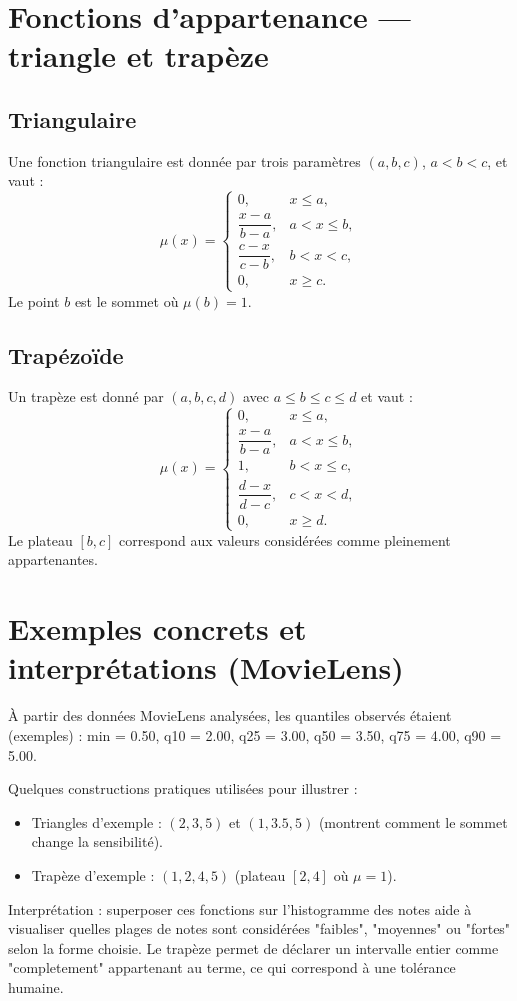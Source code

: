 \documentclass[a4paper,11pt]{article}
\begin{document}
\section{Fonctions d'appartenance — triangle et trapèze}
\subsection*{Triangulaire}
Une fonction triangulaire est donnée par trois paramètres $(a,b,c)$, $a<b<c$, et vaut :
$$
\mu(x)=\begin{cases}
0, & x\le a,\\
\dfrac{x-a}{b-a}, & a<x\le b,\\
\dfrac{c-x}{c-b}, & b<x<c,\\
0, & x\ge c.
\end{cases}
$$
Le point $b$ est le sommet où $\mu(b)=1$.

\subsection*{Trapézoïde}
Un trapèze est donné par $(a,b,c,d)$ avec $a\le b\le c\le d$ et vaut :
$$
\mu(x)=\begin{cases}
0, & x\le a,\\
\dfrac{x-a}{b-a}, & a<x\le b,\\
1, & b<x\le c,\\
\dfrac{d-x}{d-c}, & c<x<d,\\
0, & x\ge d.
\end{cases}
$$
Le plateau $[b,c]$ correspond aux valeurs considérées comme pleinement appartenantes.

\section{Exemples concrets et interprétations (MovieLens)}
À partir des données MovieLens analysées, les quantiles observés étaient (exemples) : min = 0.50, q10 = 2.00, q25 = 3.00, q50 = 3.50, q75 = 4.00, q90 = 5.00.

Quelques constructions pratiques utilisées pour illustrer :
\begin{itemize}
  \item Triangles d'exemple : $(2,3,5)$ et $(1,3.5,5)$ (montrent comment le sommet change la sensibilité).
  \item Trapèze d'exemple : $(1,2,4,5)$ (plateau $[2,4]$ où $\mu=1$).
\end{itemize}

Interprétation : superposer ces fonctions sur l'histogramme des notes aide à visualiser quelles plages de notes sont considérées "faibles", "moyennes" ou "fortes" selon la forme choisie. Le trapèze permet de déclarer un intervalle entier comme "completement" appartenant au terme, ce qui correspond à une tolérance humaine.
\end{document}
